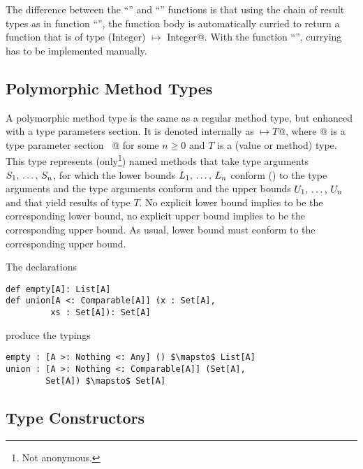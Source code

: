 The difference between the ``'' and ``'' functions is that using the chain of result types as in function ``'', the function body is automatically curried to return a function that is of type \lstinline@(Integer) $\mapsto$ Integer@. With the function ``'', currying has to be implemented manually. 






\subsection{Polymorphic Method Types}
\label{sec:polymorphic-method-types}

A polymorphic method type is the same as a regular method type, but enhanced with a type parameters section. It is denoted internally as \lstinline@[$\tps$]$ \mapsto T$@, where \lstinline@[$\tps$]@ is a type parameter section ~\lstinline@[$\pm a_1$ >: $L_1$ <: $U_1$ $\commadots$ $\pm a_n$ >: $L_n$ <: $U_n$]@ for some $n \geq 0$ and $T$ is a (value or method) type. This type represents (only\footnote{Not anonymous.}) named methods that take type arguments $S_1 ,\, \ldots ,\, S_n$, for which the lower bounds $L_1 ,\, \ldots ,\, L_n$ conform () to the type arguments and the type arguments conform and the upper bounds $U_1 ,\, \ldots ,\, U_n$ and that yield results of type $T$. No explicit lower bound implies  to be the corresponding lower bound, no explicit upper bound implies  to be the corresponding upper bound. As usual, lower bound must conform to the corresponding upper bound. 

\example The declarations
\begin{lstlisting}[escapechar=@,deletekeywords={union}]
def empty[A]: List[A]
def union[A <: Comparable[A]] (x : Set[A], 
         xs : Set[A]): Set[A]
\end{lstlisting}
produce the typings
\begin{lstlisting}[escapechar=@,deletekeywords={union}]
empty : [A >: Nothing <: Any] () $\mapsto$ List[A]
union : [A >: Nothing <: Comparable[A]] (Set[A], 
        Set[A]) $\mapsto$ Set[A]
\end{lstlisting}





\subsection{Type Constructors}
\label{sec:type-constructors}


